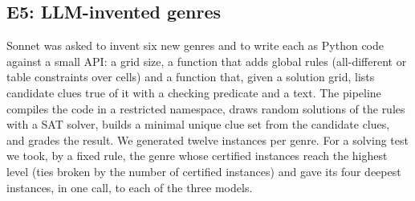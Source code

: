 \subsection{E5: LLM-invented genres}

Sonnet was asked to invent six new genres and to write each as Python code against a small API: a grid size, a function that adds global rules (all-different or table constraints over cells) and a function that, given a solution grid, lists candidate clues true of it with a checking predicate and a text. The pipeline compiles the code in a restricted namespace, draws random solutions of the rules with a SAT solver, builds a minimal unique clue set from the candidate clues, and grades the result. We generated twelve instances per genre. For a solving test we took, by a fixed rule, the genre whose certified instances reach the highest level (ties broken by the number of certified instances) and gave its four deepest instances, in one call, to each of the three models.
